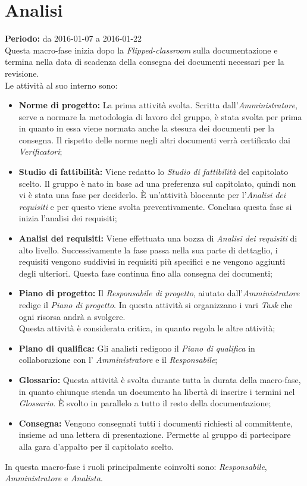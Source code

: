\documentclass[a4paper]{report}
\begin{document}
		\section{Analisi}
			\textbf{Periodo:} da 2016-01-07 a 2016-01-22 \\
			Questa macro-fase inizia dopo la \emph{Flipped-classroom} sulla documentazione e termina nella data
			di scadenza della consegna dei documenti necessari per la revisione.\\ Le attività al suo interno sono:
			\begin{itemize}
				\item \textbf{Norme di progetto:} La prima attività svolta. Scritta dall'\emph{Amministratore}, serve a normare
				la metodologia di lavoro del gruppo, è stata svolta per prima in quanto in essa viene normata anche la stesura
				dei documenti per la consegna. Il rispetto delle norme negli altri documenti verrà certificato dai \emph{Verificatori}; 
				\item \textbf{Studio di fattibilità:} Viene redatto lo \emph{Studio di fattibilità} del capitolato scelto. Il gruppo è
				nato in base ad una preferenza sul capitolato, quindi non vi è stata una fase per deciderlo. È un'attività bloccante per
				l'\emph{Analisi dei requisiti} e per questo viene svolta preventivamente. Conclusa questa fase si inizia l'analisi dei 
				requisiti;
				\item \textbf{Analisi dei requisiti:} Viene effettuata una bozza di \emph{Analisi dei requisiti} di alto livello. 
				Successivamente la fase passa nella sua parte di dettaglio, i requisiti vengono suddivisi in requisiti più specifici e 
				ne vengono aggiunti degli ulteriori. Questa fase continua fino alla consegna dei documenti;
				\item \textbf{Piano di progetto:} Il \emph{Responsabile di progetto}, aiutato dall'\emph{Amministratore} redige il 
				\emph{Piano di progetto}. In questa attività si organizzano i vari \emph{Task} che ogni risorsa andrà a svolgere.\\
				Questa attività è considerata critica, in quanto regola le altre attività;
				\item \textbf{Piano di qualifica:} Gli analisti redigono il \emph{Piano di qualifica} in collaborazione con l'
				\emph{Amministratore} e il \emph{Responsabile};
				\item \textbf{Glossario:} Questa attività è svolta durante tutta la durata della macro-fase, in quanto chiunque
				stenda un documento ha libertà di inserire i termini nel \emph{Glossario}. È svolto in parallelo a tutto il resto 
				della documentazione;
				\item \textbf{Consegna:} Vengono consegnati tutti i documenti richiesti al committente, insieme ad una lettera di 
				presentazione. Permette al gruppo di partecipare alla gara d'appalto per il capitolato scelto.
			\end{itemize}
			In questa macro-fase i ruoli principalmente coinvolti sono: \emph{Responsabile}, \emph{Amministratore} e \emph{Analista}.
\end{document}

